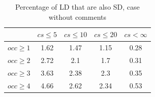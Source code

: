 \documentclass[a4paper,twoside]{article}
\begin{document}
\begin{table}[!h]
\renewcommand{\arraystretch}{1.25}
\caption{Percentage of LD that are also SD, case without comments}
\label{tab:percLD:nocomm}
\centering
\begin{tabular}{|c|c|c|c|c|}
\hline
	      &	$cs\leq 5$	&	$cs\leq 10$	&	$cs\leq 20$	&	$cs< \infty$	\\
\hline
$occ\geq 1$	&	1.62	&	1.47	&	1.15	&	0.28	\\
$occ\geq 2$	&	2.72	&	2.1	&	1.7	&	0.31	\\
$occ\geq 3$	&	3.63	&	2.38	&	2.3	&	0.35	\\
$occ\geq 4$	&	4.66	&	2.62	&	2.34	&	0.53	\\
\hline
\end{tabular}
\end{table}
\end{document}
